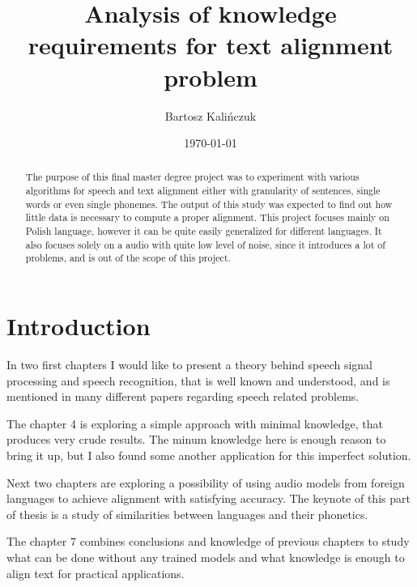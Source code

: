 \documentclass[12pt,a4paper,english]{article}
\begin{document}
\title{Analysis of knowledge requirements for text alignment problem}
\author{Bartosz Kalińczuk}
\date{\today}
\maketitle

\newpage
\begin{abstract}
The purpose of this final master degree project was to experiment with various algorithms for speech and text alignment either with granularity of sentences, single words or even single phonemes. The output of this study was expected to find out how little data is necessary to compute a proper alignment. This project focuses mainly on Polish language, however it can be quite easily generalized for different languages. It also focuses solely on a audio with quite low level of noise, since  it introduces a lot of problems, and is out of the scope of this project.
\end{abstract}


\newpage
\setcounter{tocdepth}{2}
\tableofcontents

\newpage
\section{Introduction}

In two first chapters I would like to present a theory behind speech signal processing and speech recognition,
that is well known and understood, and is mentioned in many different papers regarding speech related problems. \newline

The chapter 4 is exploring a simple approach with minimal knowledge, that produces very crude results. The minum knowledge here is enough reason to bring it up, but I also found some another application for this imperfect solution. \newline

Next two chapters are exploring a possibility of using audio models from foreign languages to achieve alignment with satisfying accuracy.
The keynote of this part of thesis is a study of similarities between languages and their phonetics. \newline

The chapter 7 combines conclusions and knowledge of previous chapters to study what can be done without any trained models and what knowledge is enough to align text for practical applications. \newline
\end{document}
